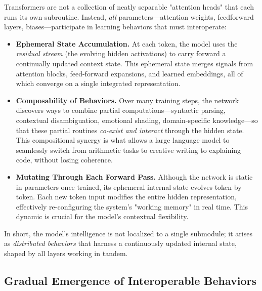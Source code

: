 \documentclass[12pt,letterpaper]{article}
\begin{document}
Transformers are not a collection of neatly separable "attention heads" that each runs its own subroutine. Instead, \emph{all} parameters—attention weights, feedforward layers, biases—participate in learning behaviors that must interoperate:
\begin{itemize}
    \item \textbf{Ephemeral State Accumulation.} At each token, the model uses the \emph{residual stream} (the evolving hidden activations) to carry forward a continually updated context state. This ephemeral state merges signals from attention blocks, feed-forward expansions, and learned embeddings, all of which converge on a single integrated representation.
    \item \textbf{Composability of Behaviors.} Over many training steps, the network discovers ways to combine partial computations—syntactic parsing, contextual disambiguation, emotional shading, domain-specific knowledge—so that these partial routines \emph{co-exist and interact} through the hidden state. This compositional synergy is what allows a large language model to seamlessly switch from arithmetic tasks to creative writing to explaining code, without losing coherence.
    \item \textbf{Mutating Through Each Forward Pass.} Although the network is static in parameters once trained, its ephemeral internal state evolves token by token. Each new token input modifies the entire hidden representation, effectively re-configuring the system's "working memory" in real time. This dynamic is crucial for the model's contextual flexibility.
\end{itemize}
In short, the model's intelligence is not localized to a single submodule; it arises as \emph{distributed behaviors} that harness a continuously updated internal state, shaped by all layers working in tandem.

\subsection{Gradual Emergence of Interoperable Behaviors}
\end{document}
